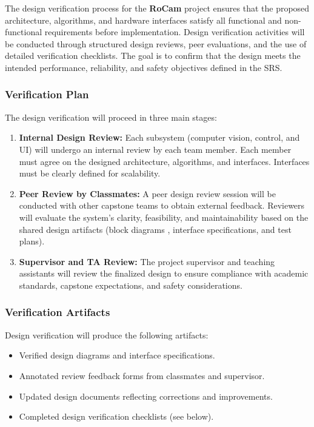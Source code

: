 \documentclass[12pt, titlepage]{article}
\begin{document}
The design verification process for the \textbf{RoCam} project ensures that the
proposed architecture, algorithms, and hardware interfaces satisfy all
functional and non-functional requirements before implementation. Design
verification activities will be conducted through structured design reviews,
peer evaluations, and the use of detailed verification checklists. The goal is
to confirm that the design meets the intended performance, reliability, and
safety objectives defined in the SRS.

\subsubsection*{Verification Plan}
The design verification will proceed in three main stages:
\begin{enumerate}
  \item \textbf{Internal Design Review:}
        Each subsystem (computer vision, control, and UI)
        will undergo an internal review by each team member. Each member must
        agree on the designed architecture, algorithms, and interfaces.
        Interfaces must be clearly defined for scalability.

  \item \textbf{Peer Review by Classmates:}
        A peer design review session will be conducted with other capstone
        teams to obtain external feedback.
        Reviewers will evaluate the system’s clarity, feasibility, and
        maintainability based on the shared design artifacts (block diagrams
        , interface specifications, and test plans).

  \item \textbf{Supervisor and TA Review:}
        The project supervisor and teaching assistants will review the
        finalized design to ensure compliance with academic standards,
        capstone expectations, and safety considerations.
\end{enumerate}

\subsubsection*{Verification Artifacts}
Design verification will produce the following artifacts:
\begin{itemize}
  \item Verified design diagrams and interface specifications.
  \item Annotated review feedback forms from classmates and supervisor.
  \item Updated design documents reflecting corrections and improvements.
  \item Completed design verification checklists (see below).
\end{itemize}
\end{document}
